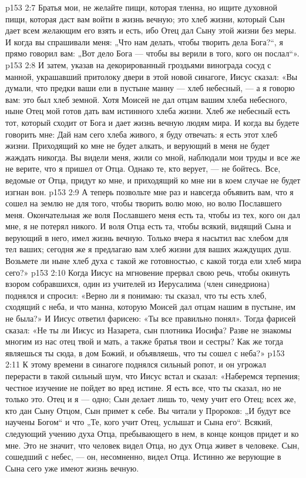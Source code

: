 \vs p153 2:7 Братья мои, не желайте пищи, которая тленна, но ищите духовной пищи, которая даст вам войти в жизнь вечную; это хлеб жизни, который Сын дает всем желающим его взять и есть, ибо Отец дал Сыну этой жизни без меры. И когда вы спрашивали меня: „Что нам делать, чтобы творить дела Бога?“, я прямо говорил вам: „Вот дело Бога --- чтобы вы верили в того, кого он послал“».
\vs p153 2:8 И затем, указав на декорированный гроздьями винограда сосуд с манной, украшавший притолоку двери в этой новой синагоге, Иисус сказал: «Вы думали, что предки ваши ели в пустыне манну --- хлеб небесный, --- а я говорю вам: это был хлеб земной. Хотя Моисей не дал отцам вашим хлеба небесного, ныне Отец мой готов дать вам истинного хлеба жизни. Хлеб же небесный есть тот, который сходит от Бога и дает жизнь вечную людям мира. И когда вы будете говорить мне: Дай нам сего хлеба живого, я буду отвечать: я есть этот хлеб жизни. Приходящий ко мне не будет алкать, и верующий в меня не будет жаждать никогда. Вы видели меня, жили со мной, наблюдали мои труды и все же не верите, что я пришел от Отца. Однако те, кто верует, --- не бойтесь. Все, ведомые от Отца, придут ко мне, и приходящий ко мне ни в коем случае не будет изгнан вон.
\vs p153 2:9 А теперь позвольте мне раз и навсегда объявить вам, что я сошел на землю не для того, чтобы творить волю мою, но волю Пославшего меня. Окончательная же воля Пославшего меня есть та, чтобы из тех, кого он дал мне, я не потерял никого. И воля Отца есть та, чтобы всякий, видящий Сына и верующий в него, имел жизнь вечную. Только вчера я насытил вас хлебом для тел ваших; сегодня же я предлагаю вам хлеб жизни для ваших жаждущих душ. Возьмете ли ныне хлеб духа с такой же готовностью, с какой тогда ели хлеб мира сего?»
\vs p153 2:10 \pc Когда Иисус на мгновение прервал свою речь, чтобы окинуть взором собравшихся, один из учителей из Иерусалима (член синедриона) поднялся и спросил: «Верно ли я понимаю: ты сказал, что ты есть хлеб, сходящий с неба, и что манна, которую Моисей дал отцам нашим в пустыне, им не была?» И Иисус ответил фарисею: «Ты все правильно понял». Тогда фарисей сказал: «Не ты ли Иисус из Назарета, сын плотника Иосифа? Разве не знакомы многим из нас отец твой и мать, а также братья твои и сестры? Как же тогда являешься ты сюда, в дом Божий, и объявляешь, что ты сошел с неба?»
\vs p153 2:11 К этому времени в синагоге поднялся сильный ропот, и он угрожал перерасти в такой сильный шум, что Иисус встал и сказал: «Наберемся терпения; честное изучение не пойдет во вред истине. Я есть все, что ты сказал, но не только это. Отец и я --- одно; Сын делает лишь то, чему учит его Отец; всех же, кто дан Сыну Отцом, Сын примет к себе. Вы читали у Пророков: „И будут все научены Богом“ и что „Те, кого учит Отец, услышат и Сына его“. Всякий, следующий учению духа Отца, пребывающего в нем, в конце концов придет и ко мне. Это не значит, что человек видел Отца, но дух Отца живет в человеке. Сын, сошедший с небес, --- он, несомненно, видел Отца. Истинно же верующие в Сына сего уже имеют жизнь вечную.
